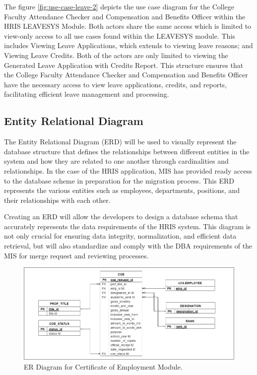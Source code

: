     The figure \ref{fig:use-case-leave-2} depicts the use case diagram for the College Faculty Attendance Checker and Compensation and Benefits Officer within the HRIS LEAVESYS Module. Both actors share the same access which is limited to view-only access to all use cases found within the LEAVESYS module. This includes Viewing Leave Applications, which extends to viewing leave reasons; and Viewing Leave Credits. Both of the actors are only limited to viewing the Generated Leave Application with Credits Report. This structure ensures that the College Faculty Attendance Checker and Compensation and Benefits Officer have the necessary access to view leave applications, credits, and reports, facilitating efficient leave management and processing.


    \subsection{Entity Relational Diagram}
    
    The Entity Relational Diagram (ERD) will be used to visually represent the database structure that defines the relationships between different entities in the system and how they are related to one another through cardinalities and relationships. In the case of the HRIS application, MIS has provided ready access to the database scheme in preparation for the migration process. This ERD represents the various entities such as employees, departments, positions, and their relationships with each other. 
    
    Creating an ERD will allow the developers to design a database schema that accurately represents the data requirements of the HRIS system. This diagram is not only crucial for ensuring data integrity, normalization, and efficient data retrieval, but will also standardize and comply with the DBA requirements of the MIS for merge request and reviewing processes.

    \begin{figure}[H]
        \centering
        \includegraphics[width=1\linewidth]{figures/images/diagrams/erd/erd-core-coe.png}
        \caption{ER Diagram for Certificate of Employment Module.}
        \label{fig:erd-core-coe}
    \end{figure}

